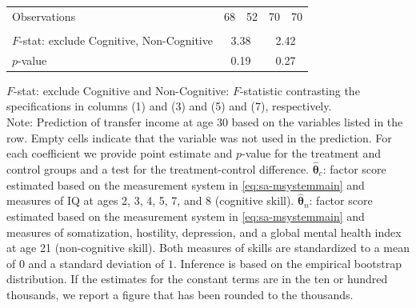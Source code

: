 \documentclass[static]{JJH-Beamer}
\begin{document}
\begin{frame}
\begin{table}[H]
\begin{center}
{\begin{tabular}{lcccccccc}
Observations &         \multicolumn{2}{c}{68} &                 \multicolumn{2}{c}{52} &               \multicolumn{2}{c}{70}  &                \multicolumn{2}{c}{70}   \\  \\
\midrule
$F$-stat: exclude Cognitive, Non-Cognitive  &                 \multicolumn{4}{c}{3.38} &              \multicolumn{4}{c}{2.42}  \\
$p$-value &                \multicolumn{4}{c}{0.19} &               \multicolumn{4}{c}{0.27}  \\
\bottomrule
\end{tabular}
}
\end{center}
\tiny \flushleft
$F$-stat: exclude Cognitive and Non-Cognitive: $F$-statistic contrasting the specifications in columns (1) and (3) and (5) and (7), respectively.\\
Note: Prediction of transfer income at age 30 based on the variables listed in the row. Empty cells indicate that the variable was not used in the prediction. For each coefficient we provide point estimate and $p$-value for the treatment and control groups and a test for the treatment-control difference. $\hat{\bm{\theta}}_{c}$: factor score estimated based on the measurement system in \eqref{eq:sa-msystemmain} and measures of IQ at ages 2, 3, 4, 5, 7, and 8 (cognitive skill). $\hat{\bm{\theta}}_{n}$: factor score estimated based on the measurement system in \eqref{eq:sa-msystemmain} and measures of somatization, hostility, depression, and a global mental health index at age 21 (non-cognitive skill). Both measures of skills are standardized to a mean of $0$ and a standard deviation of $1$. Inference is based on the empirical bootstrap distribution. If the estimates for the constant terms are in the ten or hundred thousands, we report a figure that has been rounded to the thousands.\\
\end{table}

\end{frame}
\end{document}
